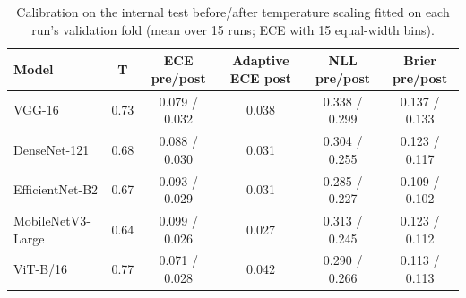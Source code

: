 \begin{table}[!tbp]
\centering
\caption{Calibration on the internal test before/after temperature scaling fitted on each run's validation fold (mean over 15 runs; ECE with 15 equal-width bins).}
\label{tab:calibration}
\footnotesize
\begin{tabular}{lccccc}
\hline
Model & T & ECE pre/post & Adaptive ECE post & NLL pre/post & Brier pre/post \\
\hline
VGG-16 & 0.73 & 0.079 / 0.032 & 0.038 & 0.338 / 0.299 & 0.137 / 0.133 \\
DenseNet-121 & 0.68 & 0.088 / 0.030 & 0.031 & 0.304 / 0.255 & 0.123 / 0.117 \\
EfficientNet-B2 & 0.67 & 0.093 / 0.029 & 0.031 & 0.285 / 0.227 & 0.109 / 0.102 \\
MobileNetV3-Large & 0.64 & 0.099 / 0.026 & 0.027 & 0.313 / 0.245 & 0.123 / 0.112 \\
ViT-B/16 & 0.77 & 0.071 / 0.028 & 0.042 & 0.290 / 0.266 & 0.113 / 0.113 \\
\hline
\end{tabular}
\end{table}